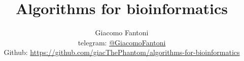 

\title{\Huge\textbf{{Algorithms for bioinformatics}}}

\author{
  Giacomo Fantoni \\
  \small telegram: \href{https://t.me/GiacomoFantoni}{@GiacomoFantoni} \\[3pt]
\small Github: \href{https://github.com/giacThePhantom/algorithms-for-bioinformatics}{https://github.com/giacThePhantom/algorithms-for-bioinformatics}
}


\maketitle
\tableofcontents



















